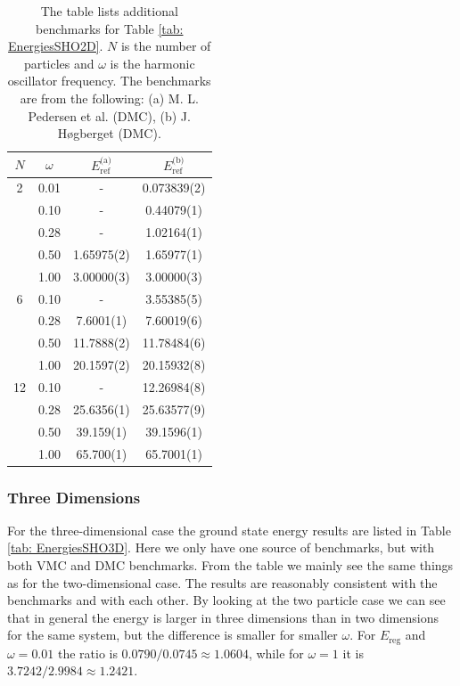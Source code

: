 \documentclass[../main.tex]{subfiles}
\begin{document}
\begin{table}[!ht]
  \centering
  \begin{tabular}{c c c c}
    \hline
    \hline
    $N$ & $\omega$ & $E_\textrm{ref}^\textrm{(a)}$ & $E_\textrm{ref}^\textrm{(b)}$ \\*
    \hline
    2 & 0.01 & - & 0.073839(2) \\*
      & 0.10 & - & 0.44079(1) \\*
      & 0.28 & - & 1.02164(1) \\*
      & 0.50 & 1.65975(2) & 1.65977(1) \\*
      & 1.00 & 3.00000(3) & 3.00000(3) \vspace{2 mm}\\*
      
    6 & 0.10 & - & 3.55385(5) \\*
      & 0.28 & 7.6001(1) & 7.60019(6) \\*
      & 0.50 & 11.7888(2) & 11.78484(6) \\*
      & 1.00 & 20.1597(2) & 20.15932(8) \vspace{2 mm}\\*
      
    12 & 0.10 & - & 12.26984(8) \\*
       & 0.28 & 25.6356(1) & 25.63577(9) \\*
       & 0.50 & 39.159(1) & 39.1596(1) \\*
       & 1.00 & 65.700(1) & 65.7001(1) \\*
    \hline
    \hline
  \end{tabular}
  \caption{The table lists additional benchmarks for Table \ref{tab: EnergiesSHO2D}. $N$ is the number of particles and $\omega$ is the harmonic oscillator frequency. The benchmarks are from the following: (a) M. L. Pedersen et al. \cite{QDotBenchmarks} (DMC), (b) J. Høgberget \cite{Jorgen} (DMC).}
  \label{tab: DMCEnergiesSHO2D}
\end{table}

\subsubsection{Three Dimensions}

For the three-dimensional case the ground state energy results are listed in Table \ref{tab: EnergiesSHO3D}. Here we only have one source of benchmarks, but with both VMC and DMC benchmarks. From the table we mainly see the same things as for the two-dimensional case. The results are reasonably consistent with the benchmarks and with each other. By looking at the two particle case we can see that in general the energy is larger in three dimensions than in two dimensions for the same system, but the difference is smaller for smaller $\omega$. For $E_\textrm{reg}$ and $\omega = 0.01$ the ratio is $0.0790/0.0745 \approx 1.0604$, while for $\omega = 1$ it is $3.7242/2.9984 \approx 1.2421$.
\end{document}
